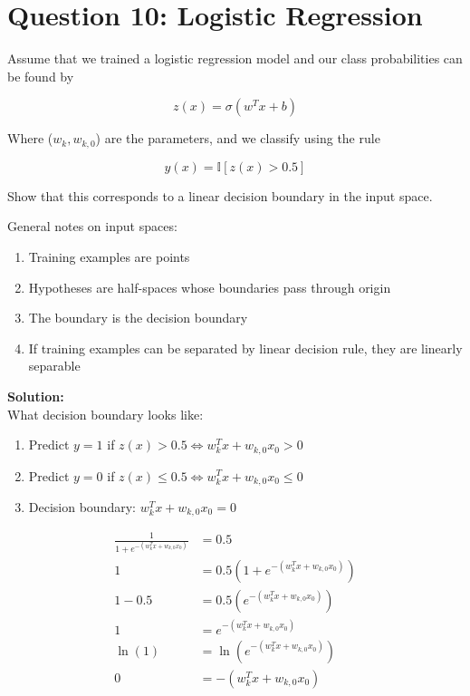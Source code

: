 \documentclass[12pt]{article}
\begin{document}
	\section*{Question 10: Logistic Regression \cite{q2}}
	Assume that we trained a logistic regression model and our class probabilities can be found by
	
	\begin{equation}
		z(x) = \sigma(w^Tx + b)
	\end{equation}
	
	Where ($w_k, w_{k,0}$) are the parameters, and we classify using the rule
	
	\begin{equation}
		y(x) = \mathbb{I} [z(x) > 0.5]
	\end{equation}
	
	Show that this corresponds to a linear decision boundary in the input space. 
	
	General notes on input spaces:
	\begin{enumerate}
		\item Training examples are points
		\item Hypotheses are half-spaces whose boundaries pass through origin
		\item The boundary is the decision boundary
		\item If training examples can be separated by linear decision rule, they are linearly separable
	\end{enumerate}
	
	\begin{framed}
		\textbf{Solution:}\\
		What decision boundary looks like:
		
		\begin{enumerate}
			\item Predict $y=1$ if $z(x) > 0.5 \iff w_k^Tx + w_{k,0}x_0 > 0$
			\item Predict $y=0$ if $z(x) \leq 0.5 \iff w_k^Tx + w_{k,0}x_0 \leq 0$
			\item Decision boundary: $ w_k^Tx + w_{k,0}x_0 = 0$
		\end{enumerate}
		
		\begin{align}
			\frac{1}{1+e^{-(w_k^Tx + w_{k,0}x_0)}} &= 0.5 \\
			1 &= 0.5\left(1+e^{-(w_k^Tx + w_{k,0}x_0)}\right) \\
			1-0.5 &= 0.5\left(e^{-(w_k^Tx + w_{k,0}x_0)}\right) \\
			1 &= e^{-(w_k^Tx + w_{k,0}x_0)} \\
			\ln (1) &= \ln \left(e^{-(w_k^Tx + w_{k,0}x_0)}\right) \\
			0 &= -(w_k^Tx + w_{k,0}x_0)
		\end{align}
	\end{framed}

	\printbibliography
	
\end{document}
